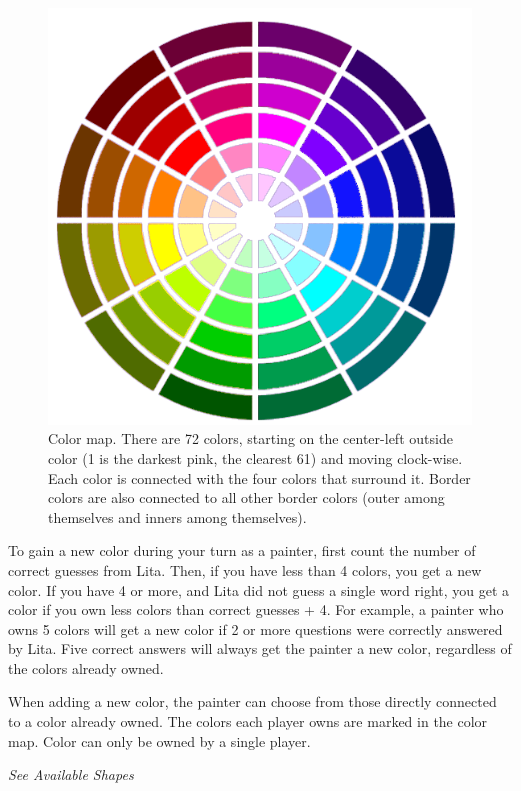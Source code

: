 \documentclass[twocolumn]{article}
\newcommand{\sublvl}[1]{\vspace{0.3cm}\large{\textit{#1}}\vspace{0.1cm}}
\begin{document}
\begin{figure}[th!]
\centering
\includegraphics[scale=0.67]{../boards/map_1.png}
\caption{Color map. There are 72 colors, starting on the center-left outside color (1 is the darkest pink, the clearest 61) and moving clock-wise. Each color is connected with the four colors that surround it. Border colors are also connected to all other border colors (outer among themselves and inners among themselves).}
\label{fig:color_map}
\end{figure}

To gain a new color during your turn as a painter, first count the number of correct guesses from Lita. Then, if you have less than 4 colors, you get a new color. If you have 4 or more, and Lita did not guess a single word right, you get a color if you own less colors than correct guesses + 4. For example, a painter who owns 5 colors will get a new color if 2 or more questions were correctly answered by Lita. Five correct answers will always get the painter a new color, regardless of the colors already owned.

When adding a new color, the painter can choose from those directly connected to a color already owned. The colors each player owns are marked in the color map. Color can only be owned by a single player.


\sublvl{See Available Shapes}
\end{document}
